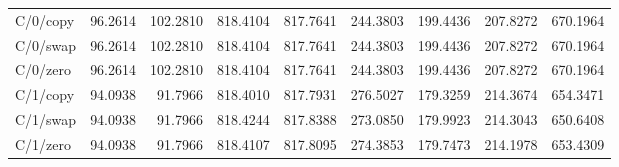 \begin{longtable}{lrrrrrrrr}
C/0/copy & 96.2614 & 102.2810 & 818.4104 & 817.7641 & 244.3803 & 199.4436 & 207.8272 & 670.1964 \\
C/0/swap & 96.2614 & 102.2810 & 818.4104 & 817.7641 & 244.3803 & 199.4436 & 207.8272 & 670.1964 \\
C/0/zero & 96.2614 & 102.2810 & 818.4104 & 817.7641 & 244.3803 & 199.4436 & 207.8272 & 670.1964 \\
C/1/copy & 94.0938 & 91.7966 & 818.4010 & 817.7931 & 276.5027 & 179.3259 & 214.3674 & 654.3471 \\
C/1/swap & 94.0938 & 91.7966 & 818.4244 & 817.8388 & 273.0850 & 179.9923 & 214.3043 & 650.6408 \\
C/1/zero & 94.0938 & 91.7966 & 818.4107 & 817.8095 & 274.3853 & 179.7473 & 214.1978 & 653.4309 \\
\bottomrule
\end{longtable}
\endgroup
